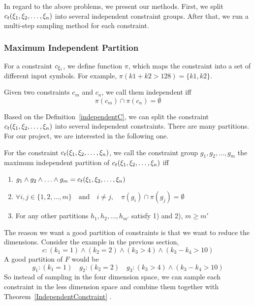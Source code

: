 In regard to the above problems, we present our methods. First, we split
$c_t({\xi}_{1},{\xi}_{2},\ldots,{\xi}_{n})$ into several independent constraint
groups. After that, we run a multi-step sampling method for each constraint.

\subsubsection{Maximum Independent Partition}

For a constraint $c_{{\xi}_{i}}$, we define function $\pi$, which maps the
constraint into a set of different input symbols. For example, $\pi(k1 + k2 >
128) = \{k1, k2\}$.

\begin{mydef}[]
      \label{independentC}
      Given two constraints $c_m$ and $c_n$, we call them independent iff
      $$\pi(c_m) \cap \pi(c_n) = \emptyset$$
\end{mydef}

Based on the Definition~\ref{independentC}, we can split the constraint
$c_t({\xi}_{1},{\xi}_{2},\ldots,{\xi}_{n})$ into several independent constraints.
There are many partitions. For our project, we are interested in the following
one.

\begin{mydef}\label{Goodpartition}
      For the constraint $c_t({\xi}_{1},{\xi}_{2},\ldots,{\xi}_{n})$,
      we call the constraint group
      $g_{1}, g_{2}, \ldots, g_{m}$
      the maximum independent partition of $c_t({\xi}_{1},{\xi}_{2},\ldots,{\xi}_{n})$ iff
      \begin{enumerate}
            \item $g_{1} \land g_{2} \land \ldots \land g_{m} = c_t({\xi}_{1},{\xi}_{2},\ldots,{\xi}_{n})$
            \item $\forall i, j \in \{1, 2, \ldots, m\} \quad \textrm{and} \quad
                        i \neq j, \quad\pi(g_{i}) \cap \pi(g_{j}) = \emptyset $
            \item For any other partitions  $h_{1}, h_{2}, \ldots, h_{m'}$ satisfy 1) and
                  2), $m \geq m'$
      \end{enumerate}

\end{mydef}

The reason we want a good partition of constraints is that we want to reduce
the dimensions. Consider the example in the previous section,
$$c: ({k_1} = 1)\land({k_2} = 2)\land({k_3} > 4)\land({k_3} - {k_4} > 10)$$ A
good partition of $F$ would be
$$g_{1}: ({k_1} = 1)\quad g_{2}: ({k_2} = 2)\quad g_{3}: ({k_3} > 4) \land
({k_3} - {k_4} > 10)$$ So instead of sampling in the four dimension space, we
can sample each constraint in the less dimension space and combine them together
with Theorem~\ref{IndependentConstraint} .


